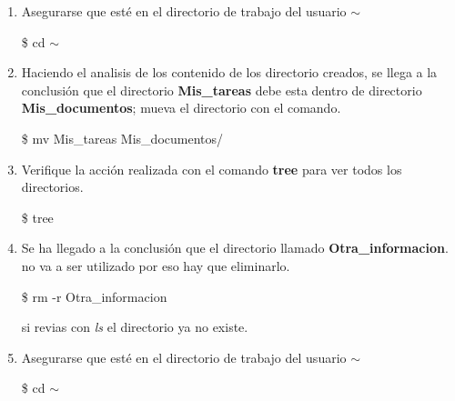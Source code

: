 \documentclass[a4paper,12pt,spanish]{article}
\begin{document}
\begin{enumerate}

 \begin{shadedbox}
   \textcolor{white}{{\large {}}}
   \end{shadedbox}

 

  \item Asegurarse que esté en el directorio de trabajo del  usuario  {\Large $\sim$} 
  \begin{tcolorbox}[colback=gray!5]
   \$ cd $\sim$
 \end{tcolorbox}

  \item Haciendo el analisis de los contenido de los directorio
  creados, se llega a la conclusión que el directorio  \textbf{Mis\_tareas} debe esta dentro de directorio
  \textbf{Mis\_documentos}; mueva el directorio con el comando.
  
  \begin{tcolorbox}[colback=gray!5]
    \$ mv  Mis\_tareas  Mis\_documentos/
  \end{tcolorbox}


   \item Verifique la acción realizada con  el comando \textbf{tree} para ver todos los directorios.
 \begin{tcolorbox}[colback=gray!5]
    \$ tree
   \end{tcolorbox}
   \item Se ha llegado a la conclusión que el  directorio llamado
   \textbf{Otra\_informacion}. no va a ser utilizado por eso hay que eliminarlo.
 \begin{tcolorbox}[colback=gray!5]
    \$ rm -r Otra\_informacion
   \end{tcolorbox}

   si revias con {\it ls} el directorio ya no existe.

   
   \begin{shadedbox}
   \textcolor{white}{{\large {}}}
   \end{shadedbox}
  \item Asegurarse que esté en el directorio de trabajo del  usuario  {\Large $\sim$} 
  \begin{tcolorbox}[colback=gray!5]
   \$ cd $\sim$
 \end{tcolorbox}


\end{enumerate}
\end{document}
